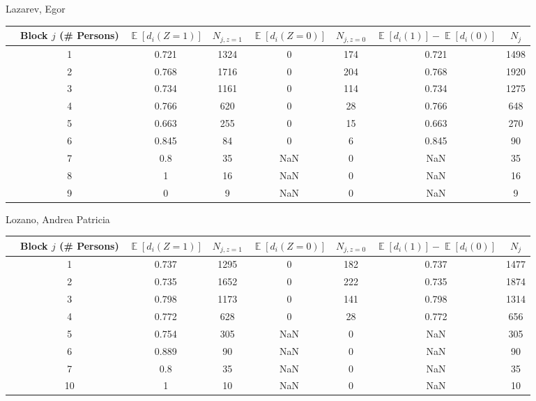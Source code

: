 \documentclass[11pt,notitlepage]{article}
\def\E{\mathop{\mathbb{E}}}
\begin{document}
Lazarev, Egor
\begin{table}[h!]\small
\begin{center}
\begin{tabular}{rc|cc|cc|cc}
  \hline
 & Block $j$ (\# Persons) & $\E[d_i(Z=1)]$ & $N_{j, z=1}$ & $\E[d_i(Z=0)]$ & $N_{j, z=0}$ & $\E[d_i(1)]-\E[d_i(0)]$ & $N_j$ \\ 
  \hline
 & 1 & 0.721 & 1324 & 0 & 174 & 0.721 & 1498 \\ 
 & 2 & 0.768 & 1716 & 0 & 204 & 0.768 & 1920 \\ 
 & 3 & 0.734 & 1161 & 0 & 114 & 0.734 & 1275 \\ 
 & 4 & 0.766 & 620 & 0 & 28 & 0.766 & 648 \\ 
 & 5 & 0.663 & 255 & 0 & 15 & 0.663 & 270 \\ 
 & 6 & 0.845 & 84 & 0 & 6 & 0.845 & 90 \\ 
 & 7 & 0.8 & 35 & NaN & 0 & NaN & 35 \\ 
 & 8 & 1 & 16 & NaN & 0 & NaN & 16 \\ 
 & 9 & 0 & 9 & NaN & 0 & NaN & 9 \\ 
   \hline
\end{tabular}
\end{center}
\end{table}


Lozano, Andrea Patricia
\begin{table}[h!]\small
\begin{center}
\begin{tabular}{rc|cc|cc|cc}
  \hline
 & Block $j$ (\# Persons) & $\E[d_i(Z=1)]$ & $N_{j, z=1}$ & $\E[d_i(Z=0)]$ & $N_{j, z=0}$ & $\E[d_i(1)]-\E[d_i(0)]$ & $N_j$ \\ 
  \hline
  & 1 & 0.737 & 1295 & 0 & 182 & 0.737 & 1477 \\ 
  & 2 & 0.735 & 1652 & 0 & 222 & 0.735 & 1874 \\ 
  & 3 & 0.798 & 1173 & 0 & 141 & 0.798 & 1314 \\ 
  & 4 & 0.772 & 628 & 0 & 28 & 0.772 & 656 \\ 
  & 5 & 0.754 & 305 & NaN & 0 & NaN & 305 \\ 
  & 6 & 0.889 & 90 & NaN & 0 & NaN & 90 \\ 
  & 7 & 0.8 & 35 & NaN & 0 & NaN & 35 \\ 
  & 10 & 1 & 10 & NaN & 0 & NaN & 10 \\ 
   \hline
\end{tabular}
\end{center}
\end{table}
\end{document}
